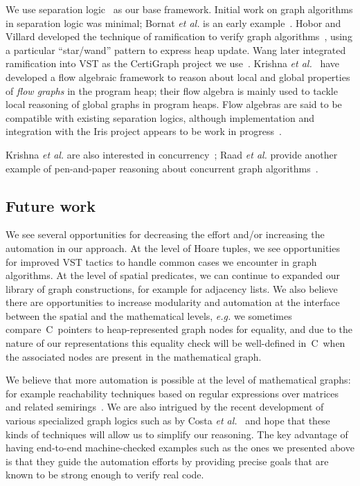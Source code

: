 We use separation logic~\cite{o2001local} as our base framework.  Initial work on graph algorithms in separation logic was minimal; Bornat \emph{et al.} is an early example~\cite{bornat:aliasing04}.  Hobor and Villard developed the technique of ramification to verify graph algorithms~\cite{hobor:ramification}, using a particular ``star/wand'' pattern to express heap update.  Wang later integrated ramification into VST as the CertiGraph project we use~\cite{DBLP:journals/pacmpl/WangCMH19}.  Krishna \emph{et al.}~\cite{krishna2017go} have developed a flow algebraic framework to reason about local and global properties of \textit{flow graphs} in the program heap; their flow algebra is mainly used to tackle local reasoning of global graphs in program heaps.
Flow algebras are said to be compatible with existing separation logics, although implementation and integration with the Iris project appears to be work in progress~\cite{DBLP:conf/esop/KrishnaSW20}.

Krishna \emph{et al.} are also interested in concurrency~\cite{krishna2017go}; Raad \emph{et al.} provide another example of pen-and-paper reasoning about concurrent graph algorithms~\cite{DBLP:conf/aplas/RaadHVG16}.

\subsection{Future work}

We see several opportunities for decreasing the effort and/or increasing the automation in our approach.  At the level of Hoare tuples, we see opportunities for improved VST tactics to handle common cases we encounter in graph algorithms.  At the level of spatial predicates, we can continue to expanded our library of graph constructions, for example for adjacency lists.  We also believe there are opportunities to increase modularity and automation at the interface between the spatial and the mathematical levels, \emph{e.g.} we sometimes compare~C~pointers to heap-represented graph
nodes for equality, and due to the nature of our representations this equality check will be
well-defined in~C~when the associated nodes are present in the mathematical graph.

We believe that more automation is possible at the level of mathematical graphs: for example reachability techniques based on regular expressions over matrices and related semirings~\cite{backhouse,DBLP:journals/jacm/Tarjan81a,dolan2013fun}.  We are also intrigued by the recent development of various specialized graph logics such as by Costa \emph{et al.}~\cite{costa:graphlogic} and hope that these kinds of techniques will allow us to simplify our reasoning.
The key advantage of having end-to-end machine-checked examples such as the ones we presented above is
that they guide the automation efforts by providing precise goals that are known to be strong
enough to verify real code.

